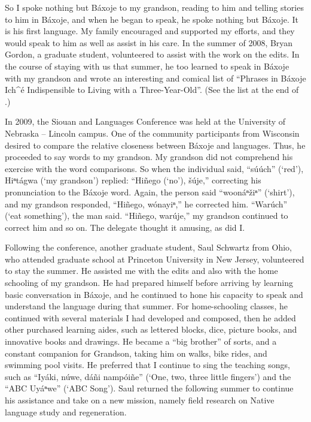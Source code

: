 \documentclass[output=paper]{LSP/langsci}
\begin{document}
So I spoke nothing but Báxoje to my grandson, reading to him and telling stories to him in Báxoje, and when he began to speak, he spoke nothing but Báxoje. It is his first language. My family encouraged and supported my efforts, and they would speak to him as well as assist in his care. In the summer of 2008, Bryan Gordon, a graduate student, volunteered to assist with the work on the  edits. In the course of staying with us that summer, he too learned to speak in Báxoje with my grandson and wrote an interesting and comical list of ``Phrases in Báxoje Ich\^{ }é Indispensible to Living with a Three-Year-Old''. (See the list at the end of .)

In 2009, the Siouan and  Languages Conference was held at the University of Nebraska -- Lincoln campus. One of the  community participants from Wisconsin desired to compare the relative closeness between Báxoje and  languages. Thus, he proceeded to say  words to my grandson. My grandson did not comprehend his exercise with the word comparisons. So when the individual said, ``súúch'' (`red'), Hiⁿtágwa (`my grandson') replied: ``Hiñego (`no'), šúje,'' correcting his pronunciation to the Báxoje word. Again, the person said ``woonáⁿ\v{z}iⁿ'' (`shirt'), and my grandson responded, ``Hiñego, wónayiⁿ,'' he corrected him. ``Warúch'' (`eat something'), the man said. ``Hiñego, warúje,'' my grandson continued to correct him and so on. The  delegate thought it amusing, as did I.

Following the conference, another graduate student, Saul Schwartz from Ohio, who attended graduate school at Princeton University in New Jersey, volunteered to stay the summer. He assisted me with the  edits and also with the home schooling of my grandson. He had prepared himself before arriving by learning basic conversation in Báxoje, and he continued to hone his capacity to speak and understand the language during that summer. For home-schooling classes, he continued with several materials I had developed and composed, then he added other purchased learning aides, such as lettered blocks, dice, picture books, and innovative books and drawings. He became a ``big brother'' of sorts, and a constant companion for Grandson, taking him on walks, bike rides, and swimming pool visits. He preferred that I continue to sing the teaching songs, such as ``Iyáki, núwe, dáñi nampóiñe'' (`One, two, three little fingers') and the ``ABC Uyáⁿwe'' (`ABC Song'). Saul returned the following summer to continue his assistance and take on a new mission, namely field research on Native language study and regeneration.  
\end{document}
